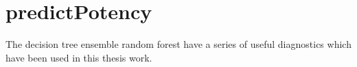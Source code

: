 \chapter{predictPotency}

The decision tree ensemble random forest have a series of useful diagnostics which have been used in this thesis work.


